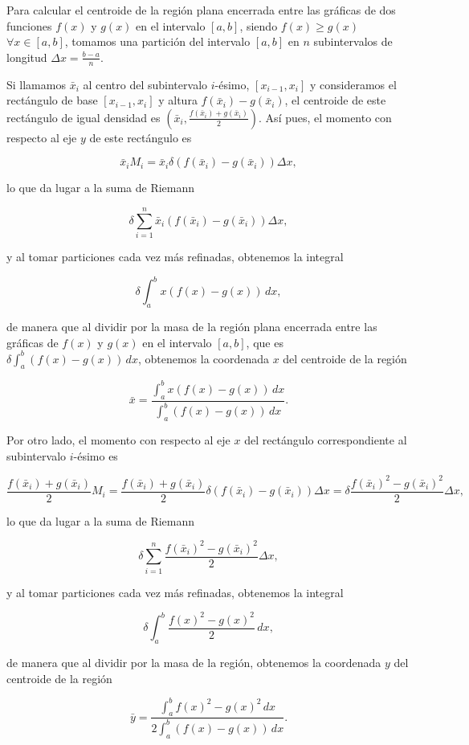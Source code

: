 \documentclass[
  spanish,
  a4paper,
]{scrreport}
\theoremstyle{definition}
\theoremstyle{remark}
\begin{document}
\begin{tcolorbox}[enhanced jigsaw, arc=.35mm, bottomrule=.15mm, bottomtitle=1mm, breakable, colback=white, colbacktitle=quarto-callout-tip-color!10!white, colframe=quarto-callout-tip-color-frame, coltitle=black, left=2mm, leftrule=.75mm, opacityback=0, opacitybacktitle=0.6, rightrule=.15mm, title=\textcolor{quarto-callout-tip-color}{\faLightbulb}\hspace{0.5em}{Solución}, titlerule=0mm, toprule=.15mm, toptitle=1mm]

Para calcular el centroide de la región plana encerrada entre las
gráficas de dos funciones \(f(x)\) y \(g(x)\) en el intervalo \([a,b]\),
siendo \(f(x)\geq g(x)\) \(\forall x\in[a,b]\), tomamos una partición
del intervalo \([a, b]\) en \(n\) subintervalos de longitud
\(\Delta x = \frac{b-a}{n}\).

Si llamamos \(\bar x_i\) al centro del subintervalo \(i\)-ésimo,
\([x_{i-1}, x_i]\) y consideramos el rectángulo de base
\([x_{i-1}, x_i]\) y altura \(f(\bar x_i) - g(\bar x_i)\), el centroide
de este rectángulo de igual densidad es
\((\bar x_i, \frac{f(\bar x_i) + g(\bar x_i)}{2})\). Así pues, el
momento con respecto al eje \(y\) de este rectángulo es

\[
\bar x_i M_i
= \bar x_i \delta(f(\bar x_i) - g(\bar x_i)) \Delta x,
\]

lo que da lugar a la suma de Riemann

\[
\delta \sum_{i=1}^n \bar x_i (f(\bar x_i) - g(\bar x_i)) \Delta x,
\]

y al tomar particiones cada vez más refinadas, obtenemos la integral

\[
\delta \int_a^b x(f(x) - g(x))\, dx,
\]

de manera que al dividir por la masa de la región plana encerrada entre
las gráficas de \(f(x)\) y \(g(x)\) en el intervalo \([a,b]\), que es
\(\delta \int_a^b (f(x) - g(x))\, dx\), obtenemos la coordenada \(x\)
del centroide de la región

\[
\bar x = \frac{\int_a^b x(f(x) - g(x))\, dx}{\int_a^b (f(x) - g(x))\, dx}.
\]

Por otro lado, el momento con respecto al eje \(x\) del rectángulo
correspondiente al subintervalo \(i\)-ésimo es

\[
\frac{f(\bar x_i) + g(\bar x_i)}{2} M_i
= \frac{f(\bar x_i) + g(\bar x_i)}{2} \delta(f(\bar x_i) - g(\bar x_i)) \Delta x
= \delta \frac{f(\bar x_i)^2 - g(\bar x_i)^2}{2} \Delta x,
\]

lo que da lugar a la suma de Riemann

\[
\delta \sum_{i=1}^n \frac{f(\bar x_i)^2 - g(\bar x_i)^2}{2} \Delta x,
\]

y al tomar particiones cada vez más refinadas, obtenemos la integral

\[
\delta \int_a^b \frac{f(x)^2 - g(x)^2}{2}\, dx,
\]

de manera que al dividir por la masa de la región, obtenemos la
coordenada \(y\) del centroide de la región

\[
\bar y = \frac{\int_a^b f(x)^2 - g(x)^2\, dx}{2\int_a^b (f(x) - g(x))\, dx}.
\]

\end{tcolorbox}
\end{document}
